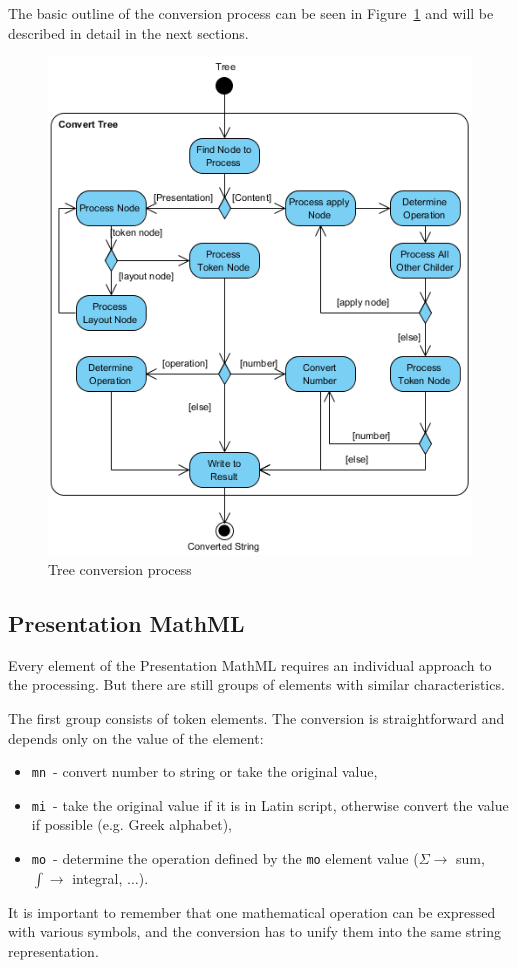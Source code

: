 \documentclass[11pt,oneside,final]{fithesis2}
\begin{document}
The basic outline of the conversion process can be seen in Figure~\ref{fig:converttree} and will be described in detail in the next sections.

\begin{figure}[!ht]
\centering
\includegraphics[width=\textwidth]{activity_diagram_tree}
\caption{Tree conversion process}
\label{fig:converttree}
\end{figure}

\subsection{Presentation MathML}
Every element of the Presentation MathML requires an individual approach to the processing. But there are still groups of elements with similar characteristics. 

The first group consists of token elements. The conversion is straightforward and depends only on the value of the element:
\begin{itemize}
\item \texttt{mn}~- convert number to string or take the original value,
\item \texttt{mi}~- take the original value if it is in Latin script, otherwise convert the value if possible (e.g. Greek alphabet),
\item \texttt{mo}~- determine the operation defined by the \texttt{mo} element value ($\Sigma \rightarrow$ sum, $\int \rightarrow$ integral, $\ldots$).
\end{itemize}
It is important to remember that one mathematical operation can be expressed with various symbols, and the conversion has to unify them into the same string representation.
\end{document}
